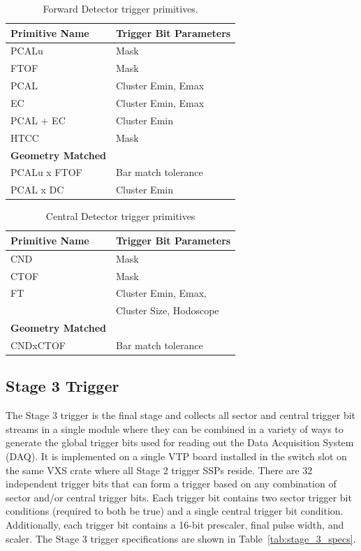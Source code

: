 \begin{table}
\begin{center}
	\begin{tabular}{| l | l |}
		\hline \hline
		Primitive Name			& Trigger Bit Parameters	\\
		\hline
		PCALu     			& Mask				\\
		FTOF    			& Mask				\\
		PCAL				& Cluster Emin, Emax		\\
		EC 				& Cluster Emin, Emax		\\
		PCAL + EC			& Cluster Emin			\\
		HTCC				& Mask				\\
		{\bf Geometry Matched}		&				\\
		PCALu x FTOF			& Bar match tolerance		\\
		PCAL x DC				& Cluster Emin			\\
		\hline \hline
	\end{tabular}
\end{center}
\caption{Forward Detector trigger primitives.}
\label{tab:fd_trig_primitives}
\end{table}

\begin{table}
\begin{center}
	\begin{tabular}{| l | l |}
		\hline \hline
		Primitive Name			& Trigger Bit Parameters	\\
		\hline
		CND     			& Mask				\\
		CTOF    			& Mask				\\
		FT				& Cluster Emin, Emax, 		\\
						& Cluster Size, Hodoscope	\\
		{\bf Geometry Matched}		&				\\
		CNDxCTOF			& Bar match tolerance		\\
		\hline \hline
	\end{tabular}
\end{center}
\caption{Central Detector trigger primitives}
\label{tab:cd_trig_primitives}
\end{table}


\subsection{Stage 3 Trigger}

The Stage 3 trigger is the final stage and collects all sector and central trigger bit streams in a single module where they can be combined in a variety of ways to generate the global trigger bits used for reading out the Data Acquisition System (DAQ). It is implemented on a single VTP board installed in the switch slot on the same VXS crate where all Stage 2 trigger SSPs reside. There are 32 independent trigger bits that can form a trigger based on any combination of sector and/or central trigger bits. Each trigger bit contains two sector trigger bit conditions (required to both be true) and a single central trigger bit condition. Additionally, each trigger bit contains a 16-bit prescaler, final pulse width, and scaler. The Stage 3 trigger specifications are shown in Table~\ref{tab:stage_3_specs}.

